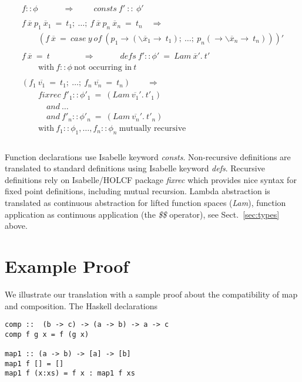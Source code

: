 \documentclass{llncs}
\begin{document}
$$\begin{array}{l}
  f :: \phi \qquad \quad \Longrightarrow \qquad 
  \ consts \ f' \ :: \ \phi' \\
   \\
 f \ \overline{x} \ p_1 \ \overline{x}_1 \ = \ t_1; \ 
  \ldots;
  \ f \ \overline{x} \ p_n \ \overline{x}_n \ = \ t_n \quad \Longrightarrow \\
  \qquad (f \ \overline{x} \ = \ case \ y \ of \ (p_1 \to (\backslash
  \overline{x}_1 \to \ t_1); \ 
  \ldots; \ p_n (\to \backslash \overline{x}_n \to \ t_n)))' \\
 \\
  f \ \overline{x} \ = \ t \qquad \qquad \Longrightarrow \qquad \quad 
                defs \ f' :: \phi' \ = \ Lam \ \overline{x}'. \ t' \\
  \qquad \mbox{with} \ f::\phi \ \mbox{not \ occurring \ in} \ t \\
 \\
  (f_1 \ \overline{v_1} \ = \ t_1; \ \ldots;
  \ f_n \ \overline{v_n} \ = \ t_n) \qquad \Longrightarrow \\
  \qquad fixrec \ f'_1 :: \phi'_1 \ =  
    \ (Lam \ \overline{v_1}'. \ t'_1)  \\
  \qquad \quad and \ \ldots \\
  \qquad \quad and \ f'_n :: \phi'_n \ =
  \ (Lam \ \overline{v_n}'. \ t'_n) \\
  \qquad \mbox{with} \ f_1::\phi_1, \ldots, f_n::\phi_n \ 
  \mbox{mutually \ recursive} \\
\end{array}$$\\


Function declarations use Isabelle keyword \emph{consts}. 
%
Non-recursive definitions are translated to standard definitions using
Isabelle keyword \emph{defs}. Recursive definitions rely on
Isabelle/HOLCF package \emph{fixrec} which provides nice syntax for
fixed point definitions, including mutual recursion. Lambda
abstraction is translated as continuous abstraction for lifted
function spaces (\emph{Lam}), function application as continuous
application (the \emph{\$\$} operator), see Sect.~\ref{sec:types}
above.

\section{Example Proof}
\label{sec:ex}

We illustrate our translation with a sample proof about the
compatibility of map and composition.
The Haskell declarations
\begin{verbatim}
comp ::  (b -> c) -> (a -> b) -> a -> c
comp f g x = f (g x)

map1 :: (a -> b) -> [a] -> [b]
map1 f [] = []
map1 f (x:xs) = f x : map1 f xs
\end{verbatim}
\end{document}
